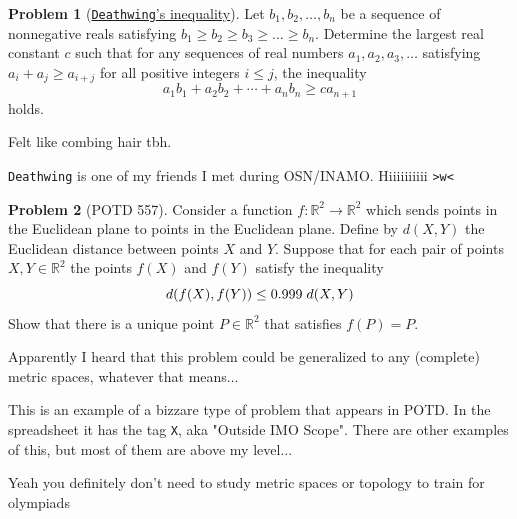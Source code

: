 \documentclass[11pt]{article} %
\theoremstyle{definition}
\newtheorem{problem}{Problem}
\theoremstyle{remark}
\begin{document}
\begin{problem}[\href{https://artofproblemsolving.com/community/c6h3627009p35569626}{\texttt{Deathwing}'s inequality}]
    Let \(b_1,b_2,\ldots, b_n\) be a sequence of nonnegative reals satisfying \(b_1 \geq b_2 \geq b_3 \geq \dots \geq b_n\). Determine the largest real constant \(c\) such that for any sequences of real numbers \(a_1, a_2, a_3, \ldots\) satisfying \(a_i + a_j \geq a_{i + j}\) for all positive integers \(i\leq j\), the inequality
    \[a_1b_1+a_2b_2+\cdots + a_nb_n \geq c a_{n+1}\]
    holds.
    \begin{talks}
        \begin{talk}
            Felt like combing hair tbh.
        \end{talk}
        \begin{talk}
            \texttt{Deathwing} is one of my friends I met during OSN/INAMO. Hiiiiiiiiii \texttt{>w<}
        \end{talk}
    \end{talks}
\end{problem}

\begin{problem}[POTD 557]
    Consider a function \(f: \mathbb{R}^2 \to \mathbb{R}^2\) which sends points in the Euclidean plane to points in the Euclidean plane.
    Define by \(d(X, Y)\) the Euclidean distance between points \(X\) and \(Y\).
    Suppose that for each pair of points \(X, Y \in \mathbb{R}^2\) the points \(f(X)\) and \(f(Y)\) satisfy the inequality
    \[d(f(X), f(Y)) \leq 0.999 \hspace{0.1cm} d(X, Y)\]
    Show that there is a unique point \(P \in \mathbb{R}^2\) that satisfies \(f(P) = P.\)
    \begin{talks}
        \begin{talk}
            Apparently I heard that this problem could be generalized to any (complete) metric spaces, whatever that means...
        \end{talk}
        \begin{talk}
            This is an example of a bizzare type of problem that appears in POTD. In the spreadsheet it has the tag \texttt{X}, aka "Outside IMO Scope". There are other examples of this, but most of them are above my level...

            Yeah you definitely don't need to study metric spaces or topology to train for olympiads 
        \end{talk}
    \end{talks}
\end{problem}
\end{document}
